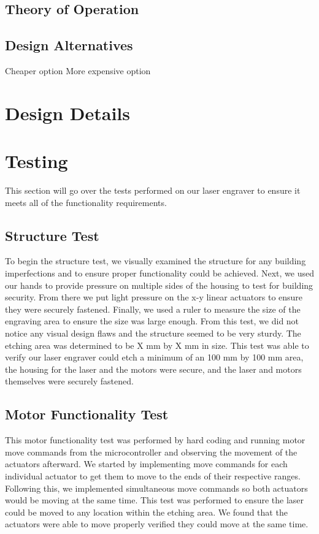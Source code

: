 \documentclass[11pt]{LaTeX-Classes/math-hw}
\begin{document}
\subsection{Theory of Operation}

\subsection{Design Alternatives}
Cheaper option
More expensive option

\section*{Design Details}

\section*{Testing}
This section will go over the tests performed on our laser engraver to ensure it meets all of the functionality requirements. 

\subsection{Structure Test}
To begin the structure test, we visually examined the structure for any building imperfections and to ensure proper functionality could be achieved. Next, we used our hands to provide pressure on multiple sides of the housing to test for building security. From there we put light pressure on the x-y linear actuators to ensure they were securely fastened. Finally, we used a ruler to measure the size of the engraving area to ensure the size was large enough. From this test, we did not notice any visual design flaws and the structure seemed to be very sturdy. The etching area was determined to be X mm by X mm in size. This test was able to verify our laser engraver could etch a minimum of an 100 mm by 100 mm area, the housing for the laser and the motors were secure, and the laser and motors themselves were securely fastened.

\subsection{Motor Functionality Test}
This motor functionality test was performed by hard coding and running motor move commands from the microcontroller and observing the movement of the actuators afterward. We started by implementing move commands for each individual actuator to get them to move to the ends of their respective ranges. Following this, we implemented simultaneous move commands so both actuators would be moving at the same time. This test was performed to ensure the laser could be moved to any location within the etching area. We found that the actuators were able to move properly verified they could move at the same time. 
\end{document}
